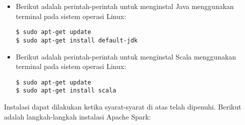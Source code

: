 \begin{itemize}

\item Berikut adalah perintah-perintah untuk menginstal Java menggunakan terminal pada sistem operasi Linux:

\begin{verbatim}
$ sudo apt-get update
$ sudo apt-get install default-jdk
\end{verbatim}

\item Berikut adalah perintah-perintah untuk menginstal Scala menggunakan terminal pada sistem operasi Linux:

\begin{verbatim}
$ sudo apt-get update
$ sudo apt-get install scala
\end{verbatim}

\end{itemize}


Instalasi dapat dilakukan ketika syarat-syarat di atas telah dipenuhi. Berikut adalah langkah-langkah instalasi Apache Spark:

